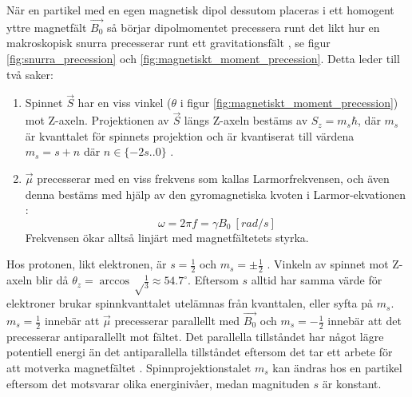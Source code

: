 \documentclass[11pt, a4paper]{article}
\begin{document}
När en partikel med en egen magnetisk dipol dessutom placeras i ett homogent yttre magnetfält $\vec{B_0}$ så börjar dipolmomentet precessera runt det likt hur en makroskopisk snurra precesserar runt ett gravitationsfält \parencite{larmor_precession}, se figur \ref{fig:snurra_precession} och \ref{fig:magnetiskt_moment_precession}. Detta leder till två saker:
\begin{enumerate}
	\item Spinnet $\vec{S}$ har en viss vinkel ($\theta$ i figur \ref{fig:magnetiskt_moment_precession}) mot Z-axeln. Projektionen av $\vec{S}$ längs Z-axeln bestäms av $S_z=m_s\hbar$, där $m_s$ är kvanttalet för spinnets projektion och är kvantiserat till värdena $m_s=s+n$ där $n\in\{-2s..0\}$ \parencite{university_physics}.
	\item $\vec{\mu}$ precesserar med en viss frekvens som kallas Larmorfrekvensen, och även denna bestäms med hjälp av den gyromagnetiska kvoten i Larmor-ekvationen \parencite{mri_lärobok}:
	\begin{equation}\label{eq:larmor}
		\omega=2\pi f=\gamma B_0\:[\si{rad/s}]
	\end{equation}
	Frekvensen ökar alltså linjärt med magnetfältetets styrka.
\end{enumerate}

Hos protonen, likt elektronen, är $s=\frac{1}{2}$ och $m_s=\pm\frac{1}{2}$ \parencite{college_physics}. Vinkeln av spinnet mot Z-axeln blir då $\theta_z=\arccos\sqrt\frac{1}{3}\approx54.7^\circ$. Eftersom $s$ alltid har samma värde för elektroner brukar spinnkvanttalet utelämnas från kvanttalen, eller syfta på $m_s$. $m_s=\frac{1}{2}$ innebär att $\vec{\mu}$ precesserar parallellt med $\vec{B_0}$ och $m_s=-\frac{1}{2}$ innebär att det precesserar antiparallellt mot fältet. Det parallella tillståndet har något lägre potentiell energi än det antiparallella tillståndet eftersom det tar ett arbete för att motverka magnetfältet \parencite{electron_spin}. Spinnprojektionstalet $m_s$ kan ändras hos en partikel eftersom det motsvarar olika energinivåer, medan magnituden $s$ är konstant. 
\end{document}
